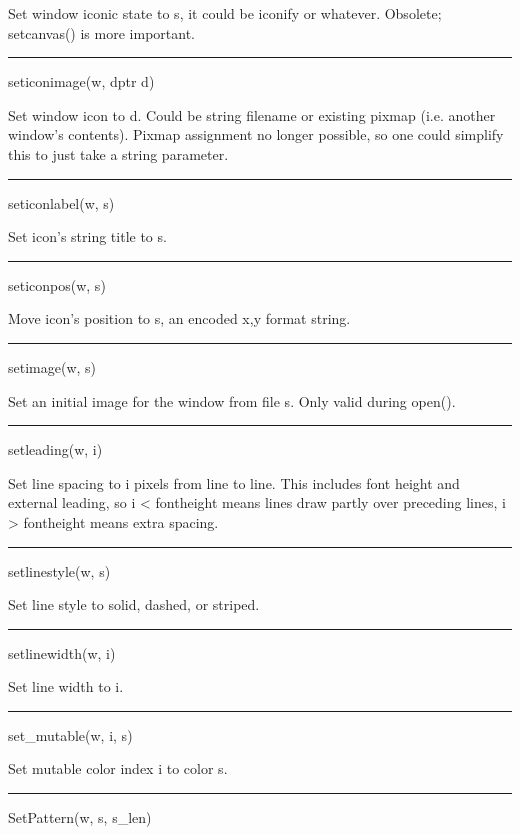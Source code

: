 Set window iconic state to \textsf{s}, it could be
\textsf{{\textquotedbl}iconify{\textquotedbl}} or whatever. Obsolete;
\textsf{setcanvas()} is more important.


\bigskip\hrule\vspace{0.1cm}
\noindent
seticonimage(w, dptr d)


Set window icon to \textsf{d}. Could be string filename or existing
pixmap (i.e. another window's contents). Pixmap assignment no longer
possible, so one could simplify this to just take a string parameter.


\bigskip\hrule\vspace{0.1cm}
\noindent
seticonlabel(w, s)


Set icon's string title to \textsf{s}.


\bigskip\hrule\vspace{0.1cm}
\noindent
seticonpos(w, s)


Move icon's position to \textsf{s}, an encoded
{\textquotedbl}x,y{\textquotedbl} format string.


\bigskip\hrule\vspace{0.1cm}
\noindent
setimage(w, s)


Set an initial image for the window from file \textsf{s}. Only valid
during \textsf{open()}.


\bigskip\hrule\vspace{0.1cm}
\noindent
setleading(w, i)


Set line spacing to \textsf{i} pixels from line to line. This includes
font height and external leading, so \textsf{i {\textless} fontheight}
means lines draw partly over preceding lines, \textsf{i {\textgreater}
fontheight} means extra spacing.


\bigskip\hrule\vspace{0.1cm}
\noindent
setlinestyle(w, s)


Set line style to solid, dashed, or striped.


\bigskip\hrule\vspace{0.1cm}
\noindent
setlinewidth(w, i)


Set line width to \textsf{i}.


\bigskip\hrule\vspace{0.1cm}
\noindent
set\_mutable(w, i, s)


Set mutable color index \textsf{i} to color \textsf{s}.


\bigskip\hrule\vspace{0.1cm}
\noindent
SetPattern(w, s, s\_len)


